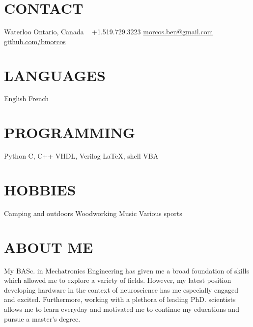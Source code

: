 \documentclass[a4paper,nocolors]{cv-friggeri-ben}
\begin{document}


\begin{aside} %
    \section{CONTACT}
    \hfill Waterloo
    \hfill Ontario, Canada
    ~
    \hfill +1.519.729.3223
    \hfill \href{mailto:morcos.ben@gmail.com}{morcos.ben@gmail.com}
    ~
    \hfill \href{https://github.com/bmorcos}{github.com/bmorcos}
    \section{LANGUAGES}
    English
    French
    \section{PROGRAMMING}
    Python
    C, C++
    VHDL, Verilog
    \LaTeX, shell
    VBA
    \section{HOBBIES}
    Camping and outdoors
    Woodworking
    Music
    Various sports
\end{aside}



\section{ABOUT ME}

\vspace{-5pt}
My BASc. in Mechatronics Engineering has given me a broad foundation of skills which allowed me to explore a variety of fields. However, my latest position developing hardware in the context of neuroscience has me especially engaged and excited. Furthermore, working with a plethora of leading PhD. scientists allows me to learn everyday and motivated me to continue my educations and pursue a master's degree.
\end{document}
